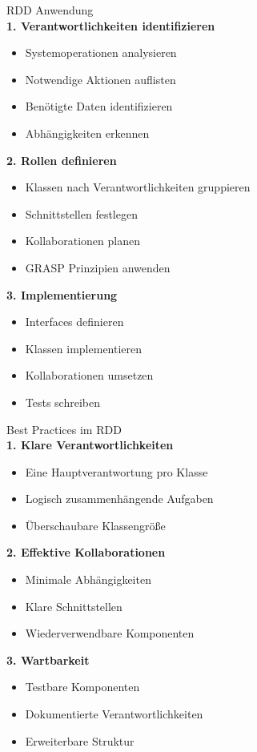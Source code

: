 \begin{KR}{RDD Anwendung}\\
\textbf{1. Verantwortlichkeiten identifizieren}
\begin{itemize}
    \item Systemoperationen analysieren
    \item Notwendige Aktionen auflisten
    \item Benötigte Daten identifizieren
    \item Abhängigkeiten erkennen
\end{itemize}

\textbf{2. Rollen definieren}
\begin{itemize}
    \item Klassen nach Verantwortlichkeiten gruppieren
    \item Schnittstellen festlegen
    \item Kollaborationen planen
    \item GRASP Prinzipien anwenden
\end{itemize}

\textbf{3. Implementierung}
\begin{itemize}
    \item Interfaces definieren
    \item Klassen implementieren
    \item Kollaborationen umsetzen
    \item Tests schreiben
\end{itemize}
\end{KR}

\begin{concept}{Best Practices im RDD}\\
\textbf{1. Klare Verantwortlichkeiten}
\begin{itemize}
    \item Eine Hauptverantwortung pro Klasse
    \item Logisch zusammenhängende Aufgaben
    \item Überschaubare Klassengröße
\end{itemize}

\textbf{2. Effektive Kollaborationen}
\begin{itemize}
    \item Minimale Abhängigkeiten
    \item Klare Schnittstellen
    \item Wiederverwendbare Komponenten
\end{itemize}

\textbf{3. Wartbarkeit}
\begin{itemize}
    \item Testbare Komponenten
    \item Dokumentierte Verantwortlichkeiten
    \item Erweiterbare Struktur
\end{itemize}
\end{concept}

